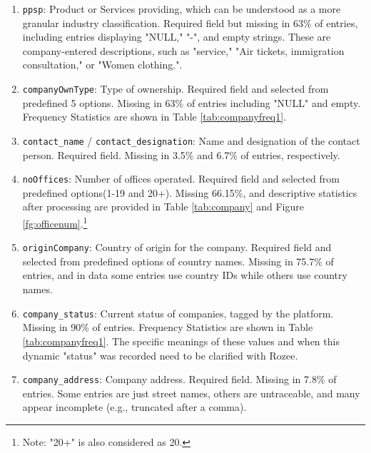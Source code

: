 \documentclass[12pt]{article}
\begin{document}
\begin{enumerate}
    
    \item \texttt{ppsp}: Product or Services providing, which can be understood as a more granular industry classification. Required field but missing in 63\% of entries, including entries displaying "NULL," "-", and empty strings. These are company-entered descriptions, such as "service," "Air tickets, immigration consultation," or "Women clothing.".


    
    \item \texttt{companyOwnType}: Type of ownership. Required field and selected from predefined 5 options. Missing in 63\% of entries including "NULL" and empty. Frequency Statistics are shown in Table \ref{tab:companyfreq1}.

    
    \item \texttt{contact\_name} / \texttt{contact\_designation}: Name and designation of the contact person. Required field. Missing in 3.5\% and 6.7\% of entries, respectively.

    
    \item \texttt{noOffices}: Number of offices operated. Required field and selected from predefined options(1-19 and 20+). Missing 66.15\%, and descriptive statistics after processing are provided in Table \ref{tab:company} and Figure \ref{fg:officenum}.\footnote{Note: "20+" is also considered as 20.}

    
    
    \item \texttt{originCompany}: Country of origin for the company. Required field and selected from predefined options of country names. Missing in 75.7\% of entries, and in data some entries use country IDs while others use country names.


    
    \item \texttt{company\_status}: Current status of companies, tagged by the platform. Missing in 90\% of entries. Frequency Statistics are shown in Table \ref{tab:companyfreq1}. The
specific meanings of these values and when this dynamic "status" was recorded need
to be clarified with Rozee.

    
    \item \texttt{company\_address}: Company address. Required field. Missing in 7.8\% of entries. Some entries are just street names, others are untraceable, and many appear incomplete (e.g., truncated after a comma). 
    
\end{enumerate}
\end{document}
